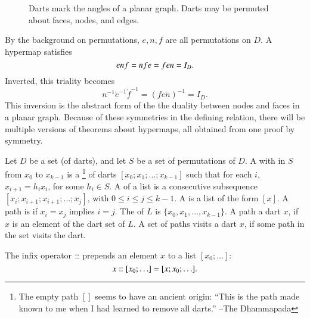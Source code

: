 \begin{figure}[htb]
\centering
{}
\caption{Darts mark the angles of a planar graph.  Darts may
be permuted about faces, nodes, and edges.}
\label{fig:hypermap_ex}
\end{figure}

By the background on permutations, $e,n,f$ are all permutations on $D$.
A hypermap satisfies 
\begin{equation}\tlabel{eqn:triality}
e \ocirc n\ocirc f = n\ocirc f\ocirc e = f\ocirc e\ocirc n = I_D.
\end{equation}
Inverted, this triality becomes
\begin{displaymath}
n^{-1} \ocirc e^{-1} \ocirc f^{-1} = (f \ocirc e \ocirc n)^{-1} = I_D.
\end{displaymath}
This inversion is the abstract form of the the duality between nodes
and faces in a planar graph.  Because of these symmetries in the
defining relation, there will be multiple versions of theorems about
hypermaps, all obtained from one proof by symmetry.


\begin{definition} 
Let $D$ be a set (of darts), and let $S$ be a set of permutations of $D$.
A  with  in $S$
from $x_0$ to $x_{k-1}$ is a \footnote{The empty path $[]$ seems
to have an ancient origin: ``This is the path made known to me
when I had learned to remove all darts.'' --The Dhammapada} of
darts $[x_0;x_1;\ldots;x_{k-1}]$ such that for each $i$, $x_{i+1} = h_i x_i$,
for some $h_i \in S$.   A  of a list is a consecutive
subsequence  $[x_i;x_{i+1};x_{i+1};\ldots;x_j]$, with $0\le i\le j\le k-1$.
A  is a list of the form $[x]$.  A
path is  if $x_i=x_j$ implies $i=j$. 
The  of $L$ is $\{x_0,x_1,\ldots,x_{k-1}\}$.  A path 
a dart $x$, if $x$ is an element of the dart set of $L$.  A set of paths visits a
dart $x$, if some path in the set visits the dart.
\end{definition}

\begin{notation}[$\cooln$]
The infix operator $\cooln$ prepends an element $x$ to a list $[x_0;\ldots]$:
\begin{displaymath}
x:\hskip-0.02em:[x_0;\ldots] = [x;x_0;\ldots].
\end{displaymath}
\end{notation}
%
%


